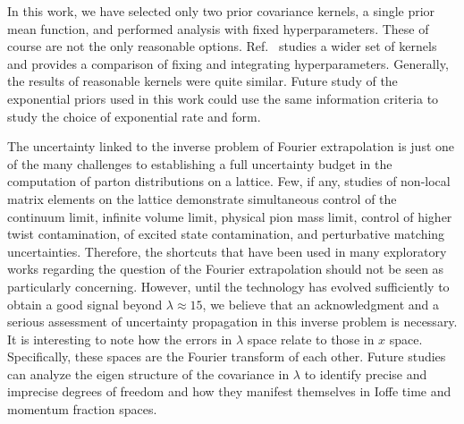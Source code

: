 \documentclass[aps,prl,groupedaddress,twocolumn,superscriptaddress,amsfonts,amssymb,amsmath,showpacs,floatfix,preprintnumbers]{revtex4-2}
\begin{document}
In this work, we have selected only two prior covariance kernels, a single prior mean function, and performed analysis with fixed hyperparameters. These of course are not the only reasonable options. Ref.~\cite{Medrano:2025cmg} studies a wider set of kernels and provides a comparison of fixing and integrating hyperparameters. Generally, the results of reasonable kernels were quite similar. Future study of the exponential priors used in this work could use the same information criteria to study the choice of exponential rate and form.

The uncertainty linked to the inverse problem of Fourier extrapolation is just one of the many challenges to establishing a full uncertainty budget in the computation of parton distributions on a lattice. Few, if any, studies of non-local matrix elements on the lattice demonstrate simultaneous control of the continuum limit, infinite volume limit, physical pion mass limit, control of higher twist contamination, of excited state contamination, and perturbative matching uncertainties. Therefore, the shortcuts that have been used in many exploratory works regarding the question of the Fourier extrapolation should not be seen as particularly concerning. However, until the technology has evolved sufficiently to obtain a good signal beyond $\lambda \approx 15$, we believe that an acknowledgment and a serious assessment of uncertainty propagation in this inverse problem is necessary. It is interesting to note how the errors in $\lambda$ space relate to those in $x$ space. Specifically, these spaces are the Fourier transform of each other. Future studies can analyze the eigen structure of the covariance in $\lambda$ to identify precise and imprecise degrees of freedom and how they manifest themselves in Ioffe time and momentum fraction spaces.
\end{document}
